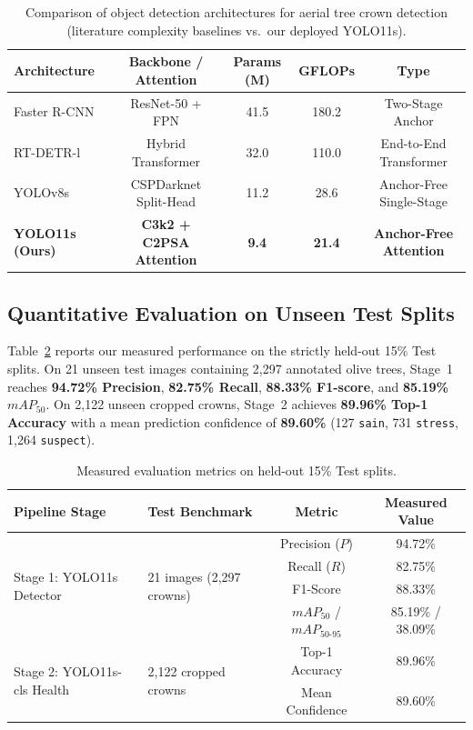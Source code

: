 \documentclass[runningheads]{llncs}
\begin{document}
\begin{table}[t]
\centering
\caption{Comparison of object detection architectures for aerial tree crown detection (literature complexity baselines vs.\ our deployed YOLO11s).}
\label{tab:arch}
\begin{tabular}{lcccc}
\toprule
\textbf{Architecture} & \textbf{Backbone / Attention} & \textbf{Params (M)} & \textbf{GFLOPs} & \textbf{Type} \\
\midrule
Faster R-CNN & ResNet-50 + FPN & 41.5 & 180.2 & Two-Stage Anchor \\
RT-DETR-l & Hybrid Transformer & 32.0 & 110.0 & End-to-End Transformer \\
YOLOv8s & CSPDarknet Split-Head & 11.2 & 28.6 & Anchor-Free Single-Stage \\
\textbf{YOLO11s (Ours)} & \textbf{C3k2 + C2PSA Attention} & \textbf{9.4} & \textbf{21.4} & \textbf{Anchor-Free Attention} \\
\bottomrule
\end{tabular}
\end{table}

\subsection{Quantitative Evaluation on Unseen Test Splits}
Table~\ref{tab:metrics} reports our measured performance on the strictly held-out 15\% Test splits. On 21 unseen test images containing 2,297 annotated olive trees, Stage~1 reaches \textbf{94.72\% Precision}, \textbf{82.75\% Recall}, \textbf{88.33\% F1-score}, and \textbf{85.19\% $mAP_{50}$}. On 2,122 unseen cropped crowns, Stage~2 achieves \textbf{89.96\% Top-1 Accuracy} with a mean prediction confidence of \textbf{89.60\%} (127 \texttt{sain}, 731 \texttt{stress}, 1,264 \texttt{suspect}).

\begin{table}[t]
\centering
\caption{Measured evaluation metrics on held-out 15\% Test splits.}
\label{tab:metrics}
\begin{tabular}{llcc}
\toprule
\textbf{Pipeline Stage} & \textbf{Test Benchmark} & \textbf{Metric} & \textbf{Measured Value} \\
\midrule
\multirow{4}{*}{Stage 1: YOLO11s Detector} & \multirow{4}{*}{21 images (2,297 crowns)} & Precision ($P$) & 94.72\% \\
 & & Recall ($R$) & 82.75\% \\
 & & F1-Score & 88.33\% \\
 & & $mAP_{50}$ / $mAP_{50\text{-}95}$ & 85.19\% / 38.09\% \\
\midrule
\multirow{2}{*}{Stage 2: YOLO11s-cls Health} & \multirow{2}{*}{2,122 cropped crowns} & Top-1 Accuracy & 89.96\% \\
 & & Mean Confidence & 89.60\% \\
\bottomrule
\end{tabular}
\end{table}
\end{document}
